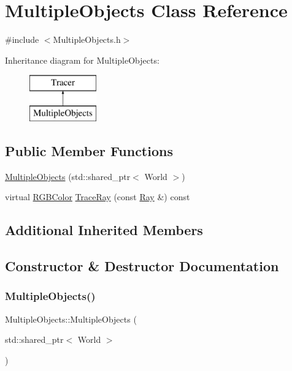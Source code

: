 \hypertarget{class_multiple_objects}{}\section{Multiple\+Objects Class Reference}
\label{class_multiple_objects}


{\ttfamily \#include $<$Multiple\+Objects.\+h$>$}

Inheritance diagram for Multiple\+Objects\+:\begin{figure}[H]
\begin{center}
\leavevmode
\includegraphics[height=2.000000cm]{class_multiple_objects}
\end{center}
\end{figure}
\subsection*{Public Member Functions}
\begin{DoxyCompactItemize}
\item 
\hyperlink{class_multiple_objects_a1d94b26c47ff2ab79c3471e0f8129ead}{Multiple\+Objects} (std\+::shared\+\_\+ptr$<$ World $>$)
\item 
virtual \hyperlink{class_r_g_b_color}{R\+G\+B\+Color} \hyperlink{class_multiple_objects_a46206cc6dd09a9c587e33ac896bc8e3a}{Trace\+Ray} (const \hyperlink{class_ray}{Ray} \&) const
\end{DoxyCompactItemize}
\subsection*{Additional Inherited Members}


\subsection{Constructor \& Destructor Documentation}
\hypertarget{class_multiple_objects_a1d94b26c47ff2ab79c3471e0f8129ead}{}\label{class_multiple_objects_a1d94b26c47ff2ab79c3471e0f8129ead} 
\subsubsection{\texorpdfstring{Multiple\+Objects()}{MultipleObjects()}}
{\footnotesize\ttfamily Multiple\+Objects\+::\+Multiple\+Objects (\begin{DoxyParamCaption}\item[{std\+::shared\+\_\+ptr$<$ World $>$}]{ }\end{DoxyParamCaption})}

